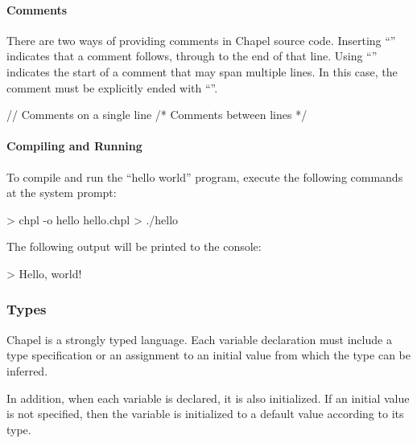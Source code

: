 \paragraph{Comments} 
There are two ways of providing comments in Chapel source code.
Inserting ``\chpl{//}'' indicates that a comment follows, through to  
the end of that line.  Using ``\chpl{/*}'' indicates the start of a comment that
may span multiple lines.  In this case, the comment must be
explicitly ended with ``\chpl{*/}''.
\begin{chapel}
// Comments on a single line
/* Comments
   between lines */
\end{chapel}

\paragraph{Compiling and Running} 
To compile and run the ``hello world'' program, execute the 
following commands at the system prompt:
\begin{commandline} 
> chpl -o hello hello.chpl
> ./hello
\end{commandline}
The following output will be printed to the console:
\begin{commandline}
> Hello, world!
\end{commandline}

\subsubsection{Types}
Chapel is a strongly typed language.  Each variable declaration
must include a type specification or an assignment to an initial value 
from which the type can be inferred.  

In addition, when each variable is declared, it is also initialized.
If an initial value is not specified, then the variable
is initialized to a default value according to its type. 
